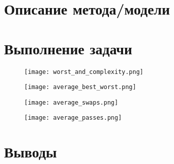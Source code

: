 \documentclass[12pt, a4paper]{report}
\begin{document}
	\section*{Описание метода/модели}
	\large

	\section*{Выполнение задачи}

	\newpage
	\vfill

	\begin{figure}
		\texttt{[image: worst\_and\_complexity.png]}
	\end{figure}
	\begin{figure}
		\texttt{[image: average\_best\_worst.png]}
	\end{figure}
	\begin{figure}
		\texttt{[image: average\_swaps.png]}
	\end{figure}
	\begin{figure}
		\texttt{[image: average\_passes.png]}
	\end{figure}

	\vfill
	\clearpage
	
	\section*{Выводы}
\end{document}
